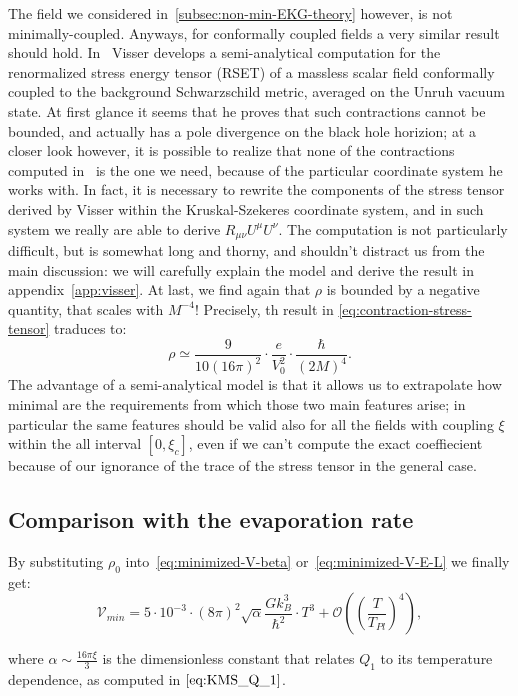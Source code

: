 The field we considered in~\ref{subsec:non-min-EKG-theory} however, is not minimally-coupled. Anyways, for conformally coupled fields a very similar result should hold. 
In~\cite{visser1997gravitational} Visser develops a semi-analytical computation for the renormalized stress energy tensor (RSET) of a massless scalar field conformally coupled to the background Schwarzschild metric, averaged on the Unruh vacuum state. At first glance it seems that he proves that such contractions cannot be bounded, and actually has a pole divergence on the black hole horizion; at a closer look however, it is possible to realize that none of the contractions computed in~\cite{visser1997gravitational} is the one we need, because of the particular coordinate system he works with. In fact, it is necessary to rewrite the components of the stress tensor derived by Visser within the Kruskal-Szekeres coordinate system, and in such system we really are able to derive \(R_{\mu\nu}U^{\mu}U^{\nu}\). The computation is not particularly difficult, but is somewhat long and thorny, and shouldn't distract us from the main discussion: we will carefully explain the model and derive the result in appendix~\ref{app:visser}. At last, we find again that \(\rho\) is bounded by a negative quantity, that scales with \(M^{-4}\)! Precisely, th result in \eqref{eq:contraction-stress-tensor} traduces to:
\[
	\rho \simeq \frac{9}{10(16\pi)^2} \cdot \frac{e}{V_0^2} \cdot \frac{\hbar}{(2M)^4}.
\] 
The advantage of a semi-analytical model is that it allows us to extrapolate how minimal are the requirements from which those two main features arise; in particular the same features should be valid also for all the fields with coupling \(\xi\) within the all interval \([0,\xi_c]\), even if we can't compute the exact coeffiecient because of our ignorance of the trace of the stress tensor in the general case.

\subsection{Comparison with the evaporation rate}
By substituting \(\rho_0\) into~\eqref{eq:minimized-V-beta} or~\eqref{eq:minimized-V-E-L} we finally get:
\begin{equation}
	\label{eq:KMS-minimized-V-beta}
	\mathcal{V}_{min} = 5\cdot10^{-3} \cdot (8\pi)^2\sqrt{\alpha} \frac{Gk_B^3}{\hbar^2} \cdot T^3 + \mathcal{O}\left(\left(\frac{T}{T_{Pl}}\right)^4\right),
\end{equation}

where \(\alpha \sim \frac{16\pi\xi}{3}\) is the dimensionless constant that relates \(Q_1\) to its temperature dependence, as computed in \(\eqref{eq:KMS_Q_1}\).

